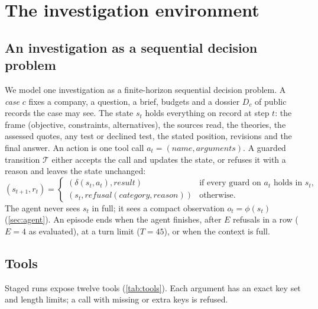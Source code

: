 \section{The investigation environment}\label{sec:env}

\subsection{An investigation as a sequential decision problem}
We model one investigation as a finite-horizon sequential decision problem. A \emph{case} $c$ fixes a company, a
question, a brief, budgets and a dossier $D_c$ of public records the case may see. The state $s_t$ holds everything on
record at step $t$: the frame (objective, constraints, alternatives), the sources read, the theories, the assessed
quotes, any test or declined test, the stated position, revisions and the final answer. An action is one tool call
$a_t = (\textit{name}, \textit{arguments})$. A guarded transition $\mathcal{T}$ either accepts the call and updates the
state, or refuses it with a reason and leaves the state unchanged:
\begin{equation}
  (s_{t+1}, r_t) =
  \begin{cases}
    (\delta(s_t, a_t), \textit{result}) & \text{if every guard on } a_t \text{ holds in } s_t,\\
    (s_t, \textit{refusal}(\textit{category}, \textit{reason})) & \text{otherwise.}
  \end{cases}
\end{equation}
The agent never sees $s_t$ in full; it sees a compact observation $o_t = \phi(s_t)$ (\cref{sec:agent}). An episode ends
when the agent finishes, after $E$ refusals in a row ($E=4$ as evaluated), at a turn limit ($T=45$), or when the context
is full.

\subsection{Tools}
Staged runs expose twelve tools (\cref{tab:tools}). Each argument has an exact key set and length limits; a call with
missing or extra keys is refused.


